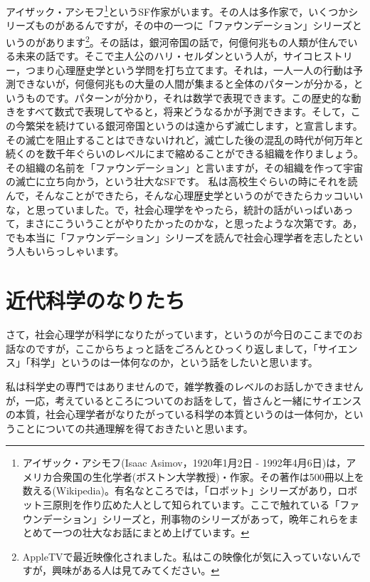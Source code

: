 \documentclass{ltjsbook}
\begin{document}
\begin{tcolorbox}[title = 余談]
アイザック・アシモフ\footnote{アイザック・アシモフ(Isaac Asimov，1920年1月2日 - 1992年4月6日)は，アメリカ合衆国の生化学者(ボストン大学教授)・作家。その著作は500冊以上を数える(Wikipedia)。有名なところでは，「ロボット」シリーズがあり，ロボット三原則を作り広めた人として知られています。ここで触れている「ファウンデーション」シリーズと，刑事物のシリーズがあって，晩年これらをまとめて一つの壮大なお話にまとめ上げています。}というSF作家がいます。その人は多作家で，いくつかシリーズものがあるんですが，その中の一つに「ファウンデーション」シリーズというのがあります\footnote{AppleTVで最近映像化されました。私はこの映像化が気に入っていないんですが，興味がある人は見てみてください。}。その話は，銀河帝国の話で，何億何兆もの人類が住んでいる未来の話です。そこで主人公のハリ・セルダンという人が，サイコヒストリー，つまり心理歴史学という学問を打ち立てます。それは，一人一人の行動は予測できないが，何億何兆もの大量の人間が集まると全体のパターンが分かる，というものです。パターンが分かり，それは数学で表現できます。この歴史的な動きをすべて数式で表現してやると，将来どうなるかが予測できます。そして，この今繁栄を続けている銀河帝国というのは遠からず滅亡します，と宣言します。その滅亡を阻止することはできないけれど，滅亡した後の混乱の時代が何万年と続くのを数千年ぐらいのレベルにまで縮めることができる組織を作りましょう。その組織の名前を「ファウンデーション」と言いますが，その組織を作って宇宙の滅亡に立ち向かう，という壮大なSFです。
私は高校生ぐらいの時にそれを読んで，そんなことができたら，そんな心理歴史学というのができたらカッコいいな，と思っていました。で，社会心理学をやったら，統計の話がいっぱいあって，まさにこういうことがやりたかったのかな，と思ったような次第です。あ，でも本当に「ファウンデーション」シリーズを読んで社会心理学者を志したという人もいらっしゃいます。
\end{tcolorbox}

\section{近代科学のなりたち}
さて，社会心理学が科学になりたがっています，というのが今日のここまでのお話なのですが，ここからちょっと話をごろんとひっくり返しまして，「サイエンス」「科学」というのは一体何なのか，という話をしたいと思います。

私は科学史の専門ではありませんので，雑学教養のレベルのお話しかできませんが，一応，考えているところについてのお話をして，皆さんと一緒にサイエンスの本質，社会心理学者がなりたがっている科学の本質というのは一体何か，ということについての共通理解を得ておきたいと思います。
\end{document}
